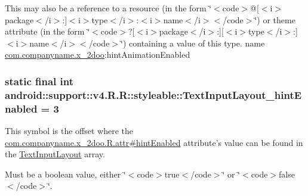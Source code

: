 This may also be a reference to a resource (in the form \char`\"{}$<$code$>$@\mbox{[}$<$i$>$package$<$/i$>$:\mbox{]}$<$i$>$type$<$/i$>$:$<$i$>$name$<$/i$>$$<$/code$>$\char`\"{}) or theme attribute (in the form \char`\"{}$<$code$>$?\mbox{[}$<$i$>$package$<$/i$>$:\mbox{]}\mbox{[}$<$i$>$type$<$/i$>$:\mbox{]}$<$i$>$name$<$/i$>$$<$/code$>$\char`\"{}) containing a value of this type.  name \hyperlink{namespacecom_1_1companyname_1_1x__2doo}{com.companyname.x\_\-2doo}:hintAnimationEnabled \hypertarget{classandroid_1_1support_1_1v4_1_1_r_1_1styleable_a55fe41974b69e81336cb0c2750c45fd}{
\subsubsection[{TextInputLayout\_\-hintEnabled}]{\setlength{\rightskip}{0pt plus 5cm}static final int android::support::v4.R.R::styleable::TextInputLayout\_\-hintEnabled = 3}}
\label{classandroid_1_1support_1_1v4_1_1_r_1_1styleable_a55fe41974b69e81336cb0c2750c45fd}


This symbol is the offset where the \hyperlink{classcom_1_1companyname_1_1x__2doo_1_1_r_1_1attr_001f6d005ae626a560ad1a3aa557b316}{com.companyname.x\_\-2doo.R.attr\#hintEnabled} attribute's value can be found in the \hyperlink{classandroid_1_1support_1_1v4_1_1_r_1_1styleable_880beb171ce483ab1b63a82ef7f9d976}{TextInputLayout} array.

Must be a boolean value, either \char`\"{}$<$code$>$true$<$/code$>$\char`\"{} or \char`\"{}$<$code$>$false$<$/code$>$\char`\"{}. 

